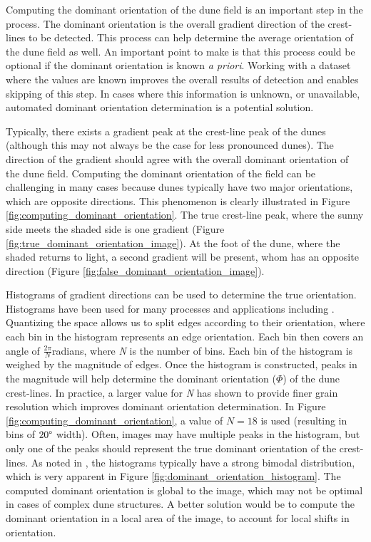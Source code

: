 Computing the dominant orientation of the dune field is an important step in the process. The dominant orientation is the overall gradient direction of the crest-lines to be detected. This process can help determine the average orientation of the dune field as well. An important point to make is that this process could be optional if the dominant orientation is known \emph{a priori}. Working with a dataset where the values are known improves the overall results of detection and enables skipping of this step. In cases where this information is unknown, or unavailable, automated dominant orientation determination is a potential solution.
 
Typically, there exists a gradient peak at the crest-line peak of the dunes (although this may not always be the case for less pronounced dunes). The direction of the gradient should agree with the overall dominant orientation of the dune field. Computing the dominant orientation of the field can be challenging in many cases because dunes typically have two major orientations, which are opposite directions. This phenomenon is clearly illustrated in Figure \ref{fig:computing_dominant_orientation}. The true crest-line peak, where the sunny side meets the shaded side is one gradient (Figure \ref{fig:true_dominant_orientation_image}). At the foot of the dune, where the shaded returns to light, a second gradient will be present, whom has an opposite direction (Figure \ref{fig:false_dominant_orientation_image}).
 
Histograms of gradient directions can be used to determine the true orientation. Histograms have been used for many processes and applications including \cite{lowe_sift_paper, dalal_histogram_oriented_gradients_human_detection, hu_gradient_field_descriptor}. Quantizing the space allows us to split edges according to their orientation, where each bin in the histogram represents an edge orientation. Each bin then covers an angle of $\frac{2\pi}{N}$radians, where \emph{N} is the number of bins. Each bin of the histogram is weighed by the magnitude of edges. Once the histogram is constructed, peaks in the magnitude will help determine the dominant orientation ($\varPhi$) of the dune crest-lines. In practice, a larger value for \emph{N} has shown to provide finer grain resolution which improves dominant orientation determination. In Figure \ref{fig:computing_dominant_orientation}, a value of $N=18$ is used (resulting in bins of $20\degree$ width). Often, images may have multiple peaks in the histogram, but only one of the peaks should represent the true dominant orientation of the crest-lines. As noted in \cite{2015_automated_mapping_of_linear_dunefield}, the histograms typically have a strong bimodal distribution, which is very apparent in Figure \ref{fig:dominant_orientation_histogram}. The computed dominant orientation is global to the image, which may not be optimal in cases of complex dune structures. A better solution would be to compute the dominant orientation in a local area of the image, to account for local shifts in orientation.
  
